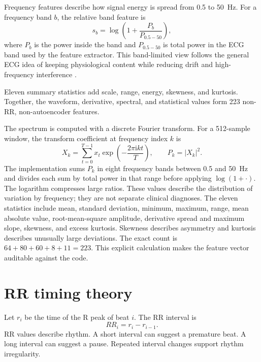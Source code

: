 Frequency features describe how signal energy is spread from 0.5 to 50~Hz. For
a frequency band $b$, the relative band feature is
\begin{equation}
 s_b=\log\left(1+\frac{P_b}{P_{0.5-50}}\right),
\end{equation}
where $P_b$ is the power inside the band and $P_{0.5-50}$ is total power in the
ECG band used by the feature extractor. This band-limited view follows the
general ECG idea of keeping physiological content while reducing drift and
high-frequency interference
\cite{kligfield2007standardization,butterworth1930filter}.

Eleven summary statistics add scale, range, energy, skewness, and kurtosis.
Together, the waveform, derivative, spectral, and statistical values form 223
non-RR, non-autoencoder features.

The spectrum is computed with a discrete Fourier transform. For a 512-sample
window, the transform coefficient at frequency index $k$ is
\begin{equation}
 X_k=\sum_{t=0}^{T-1}x_t\exp\!\left(-\frac{2\pi\mathrm{i}kt}{T}\right),
 \qquad P_k=|X_k|^2.
 \label{eq:theory-dft}
\end{equation}
The implementation sums $P_k$ in eight frequency bands between 0.5 and
50~Hz and divides each sum by total power in that range before applying
$\log(1+\cdot)$. The logarithm compresses large ratios. These values describe
the distribution of variation by frequency; they are not separate clinical
diagnoses. The eleven statistics include mean, standard deviation, minimum,
maximum, range, mean absolute value, root-mean-square amplitude, derivative
spread and maximum slope, skewness, and excess kurtosis. Skewness describes
asymmetry and kurtosis describes unusually large deviations. The exact count
is $64+80+60+8+11=223$. This explicit calculation makes the feature vector
auditable against the code.

\section{RR timing theory}

Let $r_i$ be the time of the R peak of beat $i$. The RR interval is
\begin{equation}
 RR_i=r_i-r_{i-1}.
\end{equation}
RR values describe rhythm. A short interval can suggest a premature beat. A
long interval can suggest a pause. Repeated interval changes support rhythm
irregularity.

